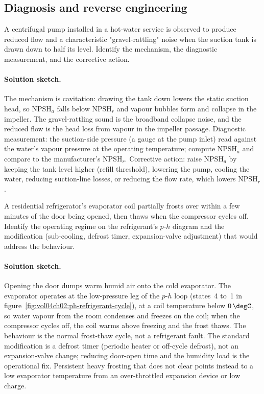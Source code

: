 \subsection*{Diagnosis and reverse engineering}

\begin{exercise}
A centrifugal pump installed in a hot-water service is observed to
produce reduced flow and a characteristic "gravel-rattling" noise
when the suction tank is drawn down to half its level. Identify the
mechanism, the diagnostic measurement, and the corrective action.

\paragraph{Solution sketch.} The mechanism is cavitation: drawing the
tank down lowers the static suction head, so $\text{NPSH}_a$ falls below
$\text{NPSH}_r$ and vapour bubbles form and collapse in the impeller. The
gravel-rattling sound is the broadband collapse noise, and the reduced
flow is the head loss from vapour in the impeller passage. Diagnostic
measurement: the suction-side pressure (a gauge at the pump inlet) read
against the water's vapour pressure at the operating temperature; compute
$\text{NPSH}_a$ and compare to the manufacturer's $\text{NPSH}_r$.
Corrective action: raise $\text{NPSH}_a$ by keeping the tank level higher
(refill threshold), lowering the pump, cooling the water, reducing
suction-line losses, or reducing the flow rate, which lowers
$\text{NPSH}_r$.
\end{exercise}

\begin{exercise}
A residential refrigerator's evaporator coil partially frosts over
within a few minutes of the door being opened, then thaws when the
compressor cycles off. Identify the operating regime on the
refrigerant's $p$-$h$ diagram and the modification (sub-cooling,
defrost timer, expansion-valve adjustment) that would address the
behaviour.

\paragraph{Solution sketch.} Opening the door dumps warm humid air onto
the cold evaporator. The evaporator operates at the low-pressure leg of
the $p$-$h$ loop (states~4 to~1 in
figure~\ref{fig:vol04ch02:ph-refrigerant-cycle}), at a coil temperature
below $0\,\degC$, so water vapour from the room condenses and freezes on
the coil; when the compressor cycles off, the coil warms above freezing
and the frost thaws. The behaviour is the normal frost-thaw cycle, not a
refrigerant fault. The standard modification is a defrost timer (periodic
heater or off-cycle defrost), not an expansion-valve change; reducing
door-open time and the humidity load is the operational fix. Persistent
heavy frosting that does not clear points instead to a low evaporator
temperature from an over-throttled expansion device or low charge.
\end{exercise}

